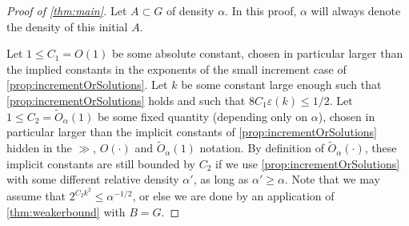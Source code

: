 \documentclass{daj}
\theoremstyle{definition}
\newcommand{\eps}{\varepsilon}
\begin{document}
\begin{proof}[Proof of \cref{thm:main}]
Let $A\subset G$ of density $\alpha$. In this proof, $\alpha$ will always denote the density of this initial $A$.

Let $1\leq C_1 = O(1)$ be some absolute constant, chosen in particular larger than the implied constants in the exponents of the small increment case of \cref{prop:incrementOrSolutions}. Let $k$ be some constant large enough such that \cref{prop:incrementOrSolutions} holds and such that $8C_1\eps(k) \leq 1/2$. Let $1\leq C_2 = \tilde{O}_{\alpha}(1)$ be some fixed quantity (depending only on $\alpha$), chosen in particular larger than the implicit constants of \cref{prop:incrementOrSolutions} hidden in the $\gg$, $O(\cdot)$ and $\tilde{O}_{\alpha}(1)$ notation. By definition of $\tilde{O}_{\alpha}(\cdot)$, these implicit constants are still bounded by $C_2$ if we use \cref{prop:incrementOrSolutions} with some different relative density $\alpha'$, as long as $\alpha' \geq \alpha$. Note that we may assume that $2^{C_2k^2} \leq \alpha^{-1/2}$, or else we are done by an application of \cref{thm:weakerbound} with $B = G$.


\end{proof}
\end{document}
